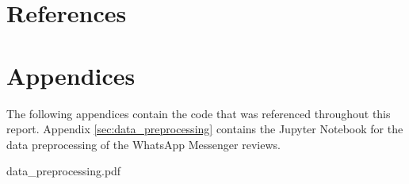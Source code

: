\documentclass[12pt]{article}
\begin{document}
    \setlength\fboxsep{5pt}
    \setlength{\fboxrule}{1pt}
    \restoregeometry

    \markboth{}{}
    {\hypersetup{linkcolor=black}
        \tableofcontents
        \thispagestyle{fancy}
    }
    \markboth{}{}

    \pagebreak

    

    \part*{References}
    \begingroup
        \def\section*#1{}
        
        
    \endgroup

    \pagebreak

    \part*{Appendices}
        \begin{appendices}
            The following appendices contain the code that was referenced
                throughout this report.
            Appendix \ref{sec:data_preprocessing} contains the Jupyter
                Notebook for the data preprocessing of the WhatsApp Messenger
                reviews.

            
            {data_preprocessing.pdf}
        \end{appendices}
\end{document}
